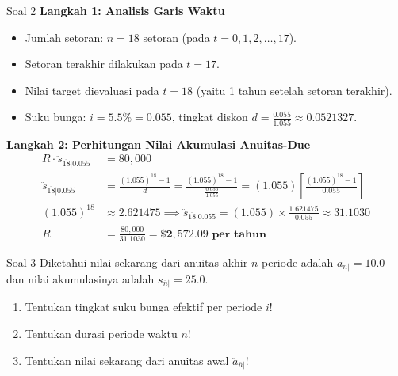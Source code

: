 \documentclass[11pt,a4paper]{article}
\begin{document}
\begin{solutionbox}{Soal 2}
\textbf{Langkah 1: Analisis Garis Waktu}
\begin{itemize}
    \item Jumlah setoran: $n = 18$ setoran (pada $t = 0, 1, 2, \dots, 17$).
    \item Setoran terakhir dilakukan pada $t = 17$.
    \item Nilai target dievaluasi pada $t = 18$ (yaitu 1 tahun setelah setoran terakhir).
    \item Suku bunga: $i = 5.5\% = 0.055$, tingkat diskon $d = \frac{0.055}{1.055} \approx 0.0521327$.
\end{itemize}

\textbf{Langkah 2: Perhitungan Nilai Akumulasi Anuitas-Due}
\begin{align*}
    R \cdot \ddot{s}_{\overline{18}|0.055} &= 80{,}000 \\[0.4em]
    \ddot{s}_{\overline{18}|0.055} &= \frac{(1.055)^{18} - 1}{d} = \frac{(1.055)^{18} - 1}{\frac{0.055}{1.055}} = (1.055) \left[\frac{(1.055)^{18} - 1}{0.055}\right] \\[0.4em]
    (1.055)^{18} &\approx 2.621475 \implies \ddot{s}_{\overline{18}|0.055} = (1.055) \times \frac{1.621475}{0.055} \approx 31.1030 \\[0.4em]
    R &= \frac{80{,}000}{31.1030} = \mathbf{\$2{,}572.09 \text{ per tahun}}
\end{align*}
\end{solutionbox}

\vspace{1.5em}

\begin{problembox}{Soal 3}
Diketahui nilai sekarang dari anuitas akhir $n$-periode adalah $a_{\overline{n}|} = 10.0$ dan nilai akumulasinya adalah $s_{\overline{n}|} = 25.0$.
\begin{enumerate}[label=(\alph*)]
    \item Tentukan tingkat suku bunga efektif per periode $i$!
    \item Tentukan durasi periode waktu $n$!
    \item Tentukan nilai sekarang dari anuitas awal $\ddot{a}_{\overline{n}|}$!
\end{enumerate}
\end{problembox}
\end{document}
